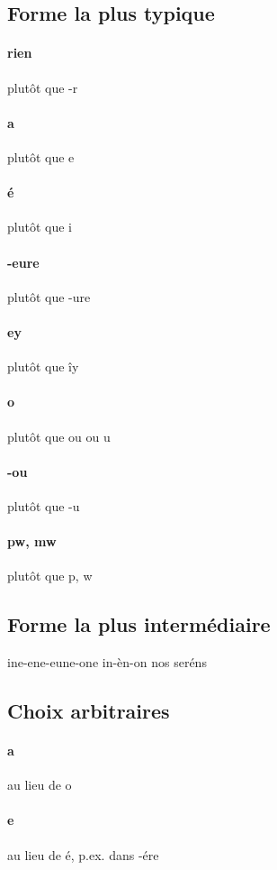 \documentclass[french]{article}
\begin{document}
\subsection{Forme la plus typique}

\paragraph{rien} plutôt que -r
\paragraph{a} plutôt que e
\paragraph{é} plutôt que i
\paragraph{-eure} plutôt que -ure
\paragraph{ey} plutôt que îy
\paragraph{o} plutôt que ou ou u
\paragraph{-ou} plutôt que -u
\paragraph{pw, mw} plutôt que p, w

\subsection{Forme la plus intermédiaire}

ine-ene-eune-one
in-èn-on
nos seréns

\subsection{Choix arbitraires}

\paragraph{a} au lieu de o
\paragraph{e} au lieu de é, p.ex. dans -ére
\end{document}
